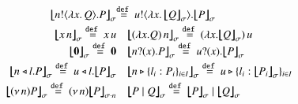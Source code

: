 %
\begin{figure}[t]
\[
\small
\begin{array}{rl}
	\auxmapp{\bout{n}{\abs{x}{Q}} P}{{}}{\sigma} &\!\!\!\!\!\!\defeq
		\bout{u}{\abs{x}{\auxmapp{Q}{{}}{\sigma}}} \auxmapp{P}{{}}{\sigma}
\\[1mm]

	\auxmapp{\appl{x}{n}}{{}}{\sigma}  \defeq
		\appl{x}{u} &
	\auxmapp{\appl{(\lambda x.Q)}{n}}{{}}{\sigma}  \defeq
		\appl{(\lambda x.\auxmapp{Q}{{}}{\sigma})}{u} \\
	\auxmapp{\inact}{{}}{\sigma}  \defeq  \inact
 & 
			\auxmapp{\binp{n}{x} P}{{}}{\sigma}\defeq
		\binp{u}{x} \auxmapp{P}{{}}{\sigma} 
\\[1mm]
	\auxmapp{\bsel{n}{l} P}{{}}{\sigma} \defeq
		\bsel{u}{l} \auxmapp{P}{{}}{\sigma} 
 & 
	\auxmapp{\bbra{n}{l_i:P_i}_{i \in I}}{{}}{\sigma}  \defeq 
		\bbra{u}{l_i:\auxmapp{P_i}{{}}{\sigma}}_{i \in I}
	\vspace{1mm} \\
\auxmapp{\news{n} P}{{}}{\sigma}  \defeq  \news{n} \auxmapp{P}{{}}{{\sigma \cat n}}
 & 
	\auxmapp{P \Par Q}{{}}{\sigma}  \defeq  \auxmapp{P}{{}}{\sigma} \Par \auxmapp{Q}{{}}{\sigma} 
\end{array}
\]

\end{figure}
